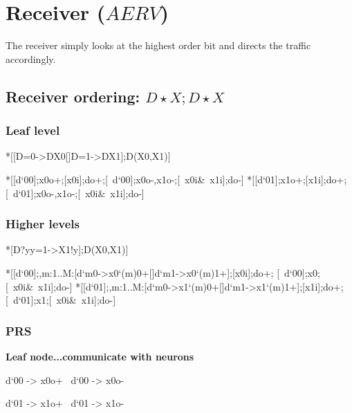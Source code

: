 \documentclass{article}
\begin{document}
\section{Receiver ($AERV$)}

The receiver simply looks at the highest order bit and directs the traffic accordingly.

\subsection{Receiver ordering: $D\!\star\!X;D\!\star\!X$}

\subsubsection{Leaf level}

\begin{csp}
*[[D=0->D\star\!X0[]D=1->D\star\!X1];D\star\!(X0,X1)]
\end{csp}

\begin{hse}
*[[d`{00}];x0o+;[x0i];do+;[~d`{00}];x0o-,x1o-;[~x0i&~x1i];do-]
*[[d`{01}];x1o+;[x1i];do+;[~d`{01}];x0o-,x1o-;[~x0i&~x1i];do-]
\end{hse}

\subsubsection{Higher levels}

\begin{csp}
*[D?y\star\![y=0->X0!y[]y=1->X1!y];D\star\!(X0,X1)]
\end{csp}

\begin{hse}
*[[d`{00}];\langle,m:1..M:[d`{m0}->x0`{(m)0}+[]d`{m1}->x0`{(m)1}+]\rangle;[x0i];do+;
  [~d`{00}];x0\!\Downarrow;[~x0i&~x1i];do-]
*[[d`{01}];\langle,m:1..M:[d`{m0}->x1`{(m)0}+[]d`{m1}->x1`{(m)1}+]\rangle;[x1i];do+;
  [~d`{01}];x1\!\Downarrow;[~x0i&~x1i];do-]
\end{hse}

\subsubsection{PRS}

\textbf{Leaf node...communicate with neurons}

\begin{prs2}
d`{00} -> x0o+
~d`{00} -> x0o-

d`{01} -> x1o+
~d`{01} -> x1o-
\end{prs2}
\end{document}
